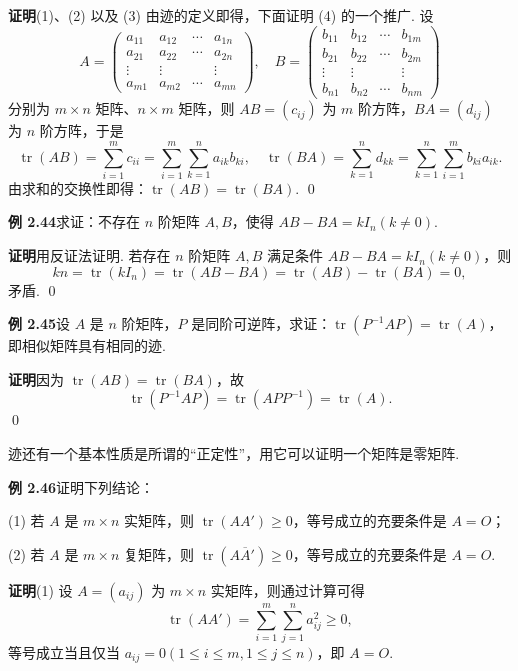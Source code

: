\documentclass[UTF8, 12pt, fontset=fandol, oneside]{ctexart}
\begin{document}
\noindent\textbf{证明}\quad (1)、(2) 以及 (3) 由迹的定义即得，下面证明 (4) 的一个推广. 设
\[
A=
\left(
\begin{array}{cccc}
a_{11} & a_{12} & \cdots & a_{1n}\\
a_{21} & a_{22} & \cdots & a_{2n}\\
\vdots & \vdots & & \vdots\\
a_{m1} & a_{m2} & \cdots & a_{mn}
\end{array}
\right),\quad
B=
\left(
\begin{array}{cccc}
b_{11} & b_{12} & \cdots & b_{1m}\\
b_{21} & b_{22} & \cdots & b_{2m}\\
\vdots & \vdots & & \vdots\\
b_{n1} & b_{n2} & \cdots & b_{nm}
\end{array}
\right)
\]
分别为 $m\times n$ 矩阵、$n\times m$ 矩阵，则 $AB=(c_{ij})$ 为 $m$ 阶方阵，$BA=(d_{ij})$ 为 $n$ 阶方阵，于是
\[
\operatorname{tr}(AB)=\sum_{i=1}^m c_{ii}
=\sum_{i=1}^m\sum_{k=1}^n a_{ik}b_{ki},\quad
\operatorname{tr}(BA)=\sum_{k=1}^n d_{kk}
=\sum_{k=1}^n\sum_{i=1}^m b_{ki}a_{ik}.
\]
由求和的交换性即得：$\operatorname{tr}(AB)=\operatorname{tr}(BA)$. \qed

\noindent\textbf{例 2.44}\quad 求证：不存在 $n$ 阶矩阵 $A,B$，使得 $AB-BA=kI_n(k\ne0)$.

\noindent\textbf{证明}\quad 用反证法证明. 若存在 $n$ 阶矩阵 $A,B$ 满足条件 $AB-BA=kI_n(k\ne0)$，则
\[
kn=\operatorname{tr}(kI_n)=\operatorname{tr}(AB-BA)=\operatorname{tr}(AB)-\operatorname{tr}(BA)=0,
\]
矛盾. \qed

\noindent\textbf{例 2.45}\quad 设 $A$ 是 $n$ 阶矩阵，$P$ 是同阶可逆阵，求证：$\operatorname{tr}(P^{-1}AP)=\operatorname{tr}(A)$，即相似矩阵具有相同的迹.

\noindent\textbf{证明}\quad 因为 $\operatorname{tr}(AB)=\operatorname{tr}(BA)$，故
\[
\operatorname{tr}(P^{-1}AP)=\operatorname{tr}(APP^{-1})=\operatorname{tr}(A).
\]
\qed

迹还有一个基本性质是所谓的“正定性”，用它可以证明一个矩阵是零矩阵.

\noindent\textbf{例 2.46}\quad 证明下列结论：

(1) 若 $A$ 是 $m\times n$ 实矩阵，则 $\operatorname{tr}(AA')\ge0$，等号成立的充要条件是 $A=O$；

(2) 若 $A$ 是 $m\times n$ 复矩阵，则 $\operatorname{tr}(A\overline A')\ge0$，等号成立的充要条件是 $A=O$.

\noindent\textbf{证明}\quad (1) 设 $A=(a_{ij})$ 为 $m\times n$ 实矩阵，则通过计算可得
\[
\operatorname{tr}(AA')=\sum_{i=1}^m\sum_{j=1}^n a_{ij}^2\ge0,
\]
等号成立当且仅当 $a_{ij}=0(1\le i\le m,1\le j\le n)$，即 $A=O$.
\end{document}
